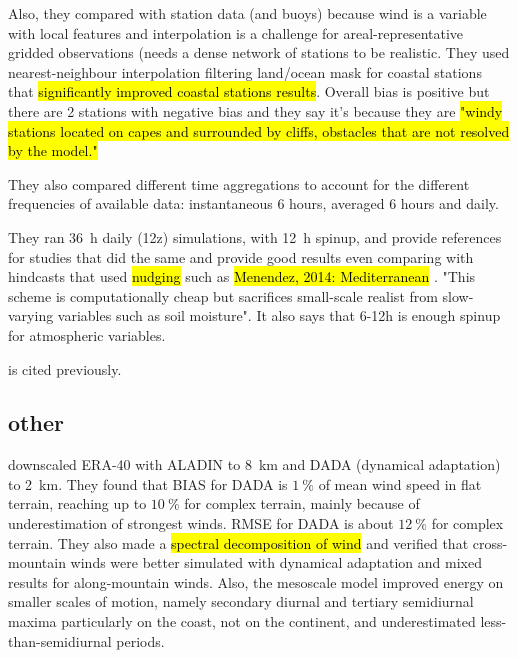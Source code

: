\documentclass[12pt,a4paper]{article}
\begin{document}
Also, they compared with station data (and buoys) because wind is a variable with local features and interpolation is a challenge for areal-representative gridded observations (needs a dense network of stations to be realistic. They used nearest-neighbour interpolation filtering land/ocean mask for coastal stations that \hl{significantly improved coastal stations results}. Overall bias is positive but there are 2 stations with negative bias and they say it's because they are \hl{"windy stations located on capes and surrounded by cliffs, obstacles that are not resolved by the model."}

They also compared different time aggregations to account for the different frequencies of available data: instantaneous 6 hours, averaged 6 hours and daily.

They ran 36~h daily (12z) simulations, with 12~h spinup, and provide references for studies that did the same and provide good results even comparing with hindcasts that used \hl{nudging} such as \hl{Menendez, 2014: Mediterranean} . "This scheme is computationally cheap but sacrifices small-scale realist from slow-varying variables such as soil moisture".  It also says that 6-12h is enough spinup for atmospheric variables.

\cite{Winterfeldt2009} is cited previously.

\subsection{other}

\cite{Horvath2011} downscaled ERA-40 with ALADIN to 8~km and DADA (dynamical adaptation) to 2~km. They found that BIAS for DADA is $1~\%$ of mean wind speed in flat terrain, reaching up to $10~\%$ for complex terrain, mainly because of underestimation of strongest winds. RMSE for DADA is about $12~\%$ for complex terrain. They also made a \hl{spectral decomposition of wind} and verified that cross-mountain winds were better simulated with dynamical adaptation and mixed results for along-mountain winds. Also, the mesoscale model improved energy on smaller scales of motion, namely secondary diurnal and tertiary semidiurnal maxima particularly on the coast, not on the continent, and underestimated less-than-semidiurnal periods.

\cite{vonStorch2017}


\printglossaries
% 


\end{document}
